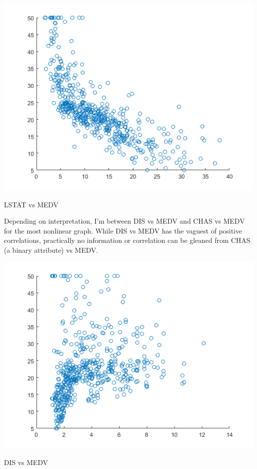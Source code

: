 \documentclass[a4paper]{article}
\begin{document}
\begin{center}
    \includegraphics[scale=1]{1c-1.png}
    \caption{LSTAT vs MEDV}
\end{center}


Depending on interpretation, I'm between DIS vs MEDV and CHAS vs MEDV for the most nonlinear graph. While DIS vs MEDV has the vaguest of positive correlations, practically no information or correlation can be gleaned from CHAS (a binary attribute) vs MEDV.

\begin{center}
    \includegraphics[scale=1]{1c-2.png}
    \caption{DIS vs MEDV}
\end{center}
\end{document}
